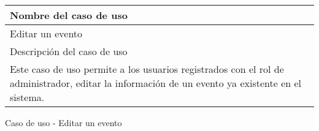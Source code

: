\begin{identificacionCasoDeUso}
	\begin{tabular} { | p{17cm} |}

		\hline
		Nombre del caso de uso                                                                                                                          \\ \hline
		Editar un evento                                                                                                                                \\ \hline
		Descripción del caso de uso                                                                                                                     \\ \hline
		Este caso de uso permite a los usuarios registrados con el rol de administrador, editar la información de un evento ya existente en el sistema. \\ \hline
	\end{tabular}
	\caption{Caso de uso - Editar un evento}
\end{identificacionCasoDeUso}
